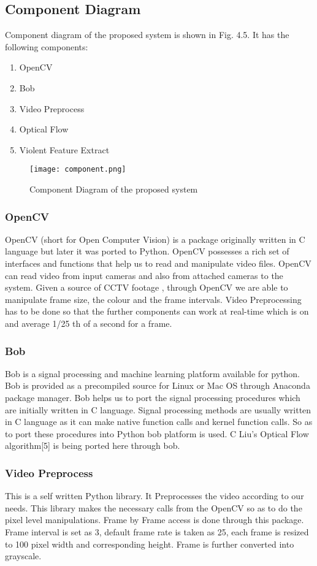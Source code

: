 \subsection{Component Diagram}
Component diagram of the proposed system is shown in Fig. 4.5. It has the following components:
\begin{enumerate}
	\item OpenCV
	\item Bob
	\item Video Preprocess
	\item Optical Flow
	\item Violent Feature Extract
\end{enumerate}
\begin{center}
\begin{figure}[H]
\centering
\texttt{[image: component.png]}
\caption{Component Diagram of the proposed system}
\end{figure}
\end{center}
\subsubsection{OpenCV}
OpenCV (short for Open Computer Vision) is a package originally written in C language but later it was ported to Python. OpenCV possesses a rich set of interfaces and functions  that help us to read and manipulate video files. OpenCV can read video from input cameras and also from attached cameras to the system. Given a source of CCTV footage , through OpenCV we are able to manipulate frame size, the colour and the frame intervals. Video Preprocessing has to be done so that the further components can work at real-time which is on and average 1/25 th of a second for a frame.
\subsubsection{Bob}
Bob is a signal processing and machine learning platform available for python. Bob is provided as a precompiled source for Linux or Mac OS through Anaconda package manager. Bob helps us to port the signal processing procedures which are initially written in C language. Signal processing methods are usually written in C language as it can make native function calls and kernel function calls. So as to port these procedures into Python bob platform is used. C Liu's Optical Flow algorithm[5] is being ported here through bob.
\subsubsection{Video Preprocess}
This is a self written Python library. It Preprocesses the video according to our needs. This library makes the necessary calls from the OpenCV so as to do the pixel level manipulations. Frame by Frame access is done through this package. Frame interval is set as 3, default frame rate is taken as 25, each frame is resized to 100 pixel width and corresponding height. Frame is further converted into grayscale.
